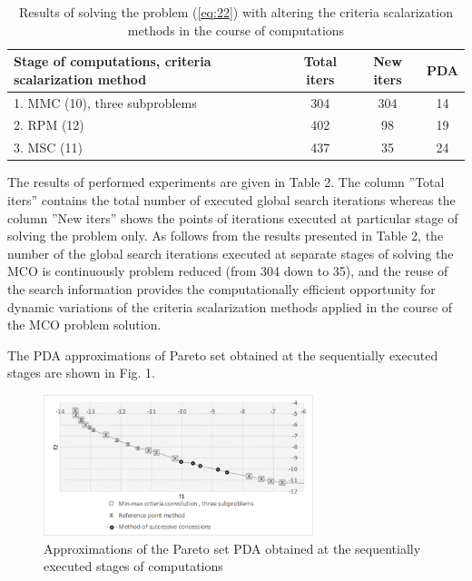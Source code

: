 \documentclass[runningheads]{llncs}
\begin{document}
\begin{table}[ht]
\centering
\caption{Results of solving the problem (\ref{eq:22}) with altering the criteria scalarization methods in the course of computations}
\label{tab:02}
\begin{tabular}{lccc}
\hline
Stage of computations, criteria scalarization method & Total iters & New iters & PDA \\ \hline
1. MMC (10), three subproblems                       & 304         & 304       & 14  \\
2. RPM (12)                                          & 402         & 98        & 19  \\
3. MSC (11)                                          & 437         & 35        & 24  \\ \hline
\end{tabular}
\end{table}

The results of performed experiments are given in Table 2. The column ''Total iters'' contains the total number of executed global search iterations whereas the column ''New iters'' shows the points of iterations executed at particular stage of solving the problem only. As follows from the results presented in Table 2, the number of the global search iterations executed at separate stages of solving the MCO is continuously problem reduced (from 304 down to 35), and the reuse of the search information provides the computationally efficient opportunity for dynamic variations of the criteria scalarization methods applied in the course of the MCO problem solution.


The PDA approximations of Pareto set obtained at the sequentially executed stages are shown in Fig. 1.
\begin{figure}[ht]
	\centering
		\includegraphics[width=0.70\textwidth]{fig1}
	\caption{Approximations of the Pareto set PDA obtained at the sequentially executed stages of computations}
	\label{fig:1}
\end{figure}
\end{document}
